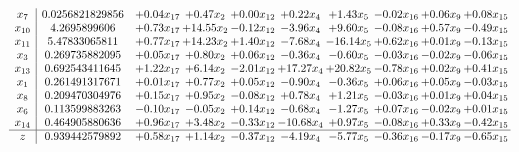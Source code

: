 \documentclass[9pt]{article}
\begin{document}
\[\begin{array}{c| c c@{\hskip 2pt} c@{\hskip 2pt} c@{\hskip 2pt} c@{\hskip 2pt} c@{\hskip 2pt} c@{\hskip 2pt} c@{\hskip 2pt} c@{\hskip 2pt} }
 x_{7}   &  0.0256821829856 & +  0.04 x_{17} & +  0.47 x_{2} & +  0.00 x_{12} & +  0.22 x_{4} & +  1.43 x_{5} & -0.02 x_{16} & +  0.06 x_{9} & +  0.08 x_{15}\\
 x_{10}   &  4.2695899606 & +  0.73 x_{17} & + 14.55 x_{2} & -0.12 x_{12} & -3.96 x_{4} & +  9.60 x_{5} & -0.08 x_{16} & +  0.57 x_{9} & -0.49 x_{15}\\
 x_{11}   &  5.47833065811 & +  0.77 x_{17} & + 14.23 x_{2} & +  1.40 x_{12} & -7.68 x_{4} & -16.14 x_{5} & +  0.62 x_{16} & +  0.01 x_{9} & -0.13 x_{15}\\
 x_{3}   &  0.269735882095 & +  0.05 x_{17} & +  0.80 x_{2} & +  0.06 x_{12} & -0.36 x_{4} & -0.60 x_{5} & -0.03 x_{16} & -0.02 x_{9} & -0.06 x_{15}\\
 x_{13}   &  0.692543411645 & +  1.22 x_{17} & +  6.14 x_{2} & -2.01 x_{12} & + 17.27 x_{4} & + 20.82 x_{5} & -0.78 x_{16} & +  0.02 x_{9} & +  0.41 x_{15}\\
 x_{1}   &  0.261491317671 & +  0.01 x_{17} & +  0.77 x_{2} & +  0.05 x_{12} & -0.90 x_{4} & -0.36 x_{5} & +  0.06 x_{16} & +  0.05 x_{9} & -0.03 x_{15}\\
 x_{8}   &  0.209470304976 & +  0.15 x_{17} & +  0.95 x_{2} & -0.08 x_{12} & +  0.78 x_{4} & +  1.21 x_{5} & -0.03 x_{16} & +  0.01 x_{9} & +  0.04 x_{15}\\
 x_{6}   &  0.113599883263 & -0.10 x_{17} & -0.05 x_{2} & +  0.14 x_{12} & -0.68 x_{4} & -1.27 x_{5} & +  0.07 x_{16} & -0.02 x_{9} & +  0.01 x_{15}\\
 x_{14}   &  0.464905880636 & +  0.96 x_{17} & +  3.48 x_{2} & -0.33 x_{12} & -10.68 x_{4} & +  0.97 x_{5} & -0.08 x_{16} & +  0.33 x_{9} & -0.42 x_{15}\\
\hline
z    &  0.939442579892 & +  0.58 x_{17} & +  1.14 x_{2} & -0.37 x_{12} & -4.19 x_{4} & -5.77 x_{5} & -0.36 x_{16} & -0.17 x_{9} & -0.65 x_{15}\\
\end{array}\]
\end{document}
